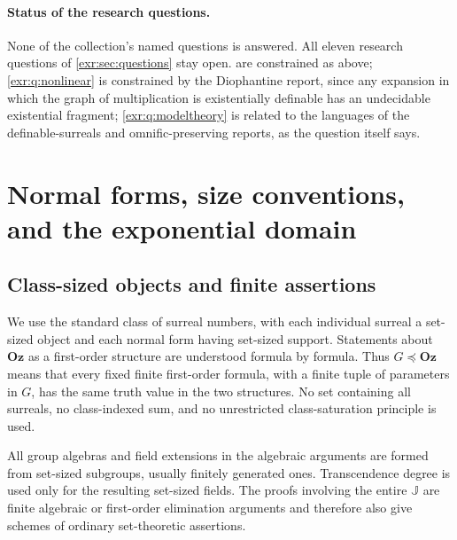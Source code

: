 \documentclass[11pt,letterpaper]{article}
\numberwithin{equation}{section}
\theoremstyle{definition}
\theoremstyle{remark}
\newcommand{\Oz}{\mathbf{Oz}}
\newcommand{\J}{\mathbb J}
\begin{document}
\paragraph{Status of the research questions.} None of the collection's named
questions is answered. All eleven research questions of
\cref{exr:sec:questions} stay open.  are
constrained as above; \cref{exr:q:nonlinear} is constrained by the Diophantine report,
since any expansion in which the graph of multiplication is existentially
definable has an undecidable existential fragment; \cref{exr:q:modeltheory} is related to the languages of the definable-surreals and
omnific-preserving reports, as the question itself says.

\section{Normal forms, size conventions, and the exponential domain}\label{exr:sec:foundations}
\subsection{Class-sized objects and finite assertions}
We use the standard class of surreal numbers, with each individual surreal a
set-sized object and each normal form having set-sized support. Statements about
$\Oz$ as a first-order structure are understood formula by formula. Thus
$G\preccurlyeq\Oz$ means that every fixed finite first-order formula, with a finite
tuple of parameters in $G$, has the same truth value in the two structures.
No set containing all surreals, no class-indexed sum, and no unrestricted
class-saturation principle is used.

All group algebras and field extensions in the algebraic arguments are formed from
set-sized subgroups, usually finitely generated ones. Transcendence degree is used
only for the resulting set-sized fields. The proofs involving the entire $\J$
are finite algebraic or first-order elimination arguments and therefore also give
schemes of ordinary set-theoretic assertions.
\end{document}
